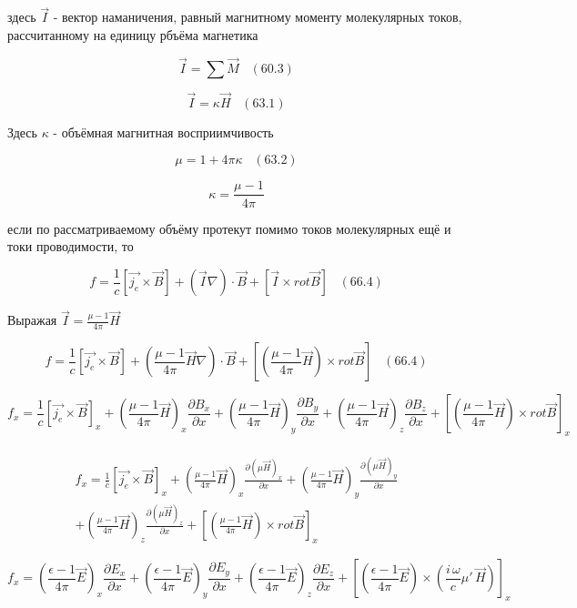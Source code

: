 \documentclass[11pt]{article}
\begin{document}
здесь \(\vec I\) - вектор наманичения, равный магнитному моменту
молекулярных токов, рассчитанному на единицу рбъёма магнетика

\[\vec I = \sum \vec M \,\,\,\,\,(60.3)\]

\[\vec I = \kappa \vec H \,\,\,\,\,(63.1)\]

Здесь \(\kappa\) - объёмная магнитная восприимчивость

\[\mu = 1+4\pi\kappa \,\,\,\,\,(63.2)\]

\[\kappa  = \frac{\mu - 1}{4\pi}\]

если по рассматриваемому объёму протекут помимо токов молекулярных ещё и
токи проводимости, то

\[f = \frac{1}{c} \left[\vec {j_e} \times \vec{B} \right] + \left(\vec {I} \nabla \right) \cdot \vec {B} + \left[\vec{I} \times rot \vec{B}\right] \,\,\,\,\,(66.4)\]

Выражая \(\vec I = \frac{\mu - 1}{4\pi} \vec H\)

\[f = \frac{1}{c} \left[\vec {j_e} \times \vec{B} \right] + \left(\frac{\mu - 1}{4\pi} \vec H \nabla \right) \cdot \vec {B} + \left[\left(\frac{\mu - 1}{4\pi} \vec H \right) \times rot \vec{B}\right] \,\,\,\,\,(66.4)\]

    \[
f_x
= \frac{1}{c} \left[\vec {j_e} \times \vec{B} \right]_x
+ \left(\frac{\mu - 1}{4 \pi}\vec{H}\right)_x \frac{\partial B_x}{\partial x}
+ \left(\frac{\mu - 1}{4 \pi}\vec{H}\right)_y \frac{\partial B_y}{\partial x}
+ \left(\frac{\mu - 1}{4 \pi}\vec{H}\right)_z \frac{\partial B_z}{\partial x}
+ \left[\left(\frac{\mu - 1}{4 \pi}\vec{H}\right) \times rot \vec{B}\right]_x
\]

    \[\begin{array}{c} \\
f_x
= \frac{1}{c} \left[\vec {j_e} \times \vec{B} \right]_x
+ \left(\frac{\mu - 1}{4 \pi}\vec{H}\right)_x \frac{\partial \left(\mu \vec{H}\right)_x}{\partial x}
+ \left(\frac{\mu - 1}{4 \pi}\vec{H}\right)_y \frac{\partial \left(\mu \vec{H}\right)_y}{\partial x} \\
+ \left(\frac{\mu - 1}{4 \pi}\vec{H}\right)_z \frac{\partial \left(\mu \vec{H}\right)_z}{\partial x}
+ \left[\left(\frac{\mu - 1}{4 \pi}\vec{H}\right) \times rot \vec{B}\right]_x
\end{array}\]

    \[
f_x
= \left(\frac{\epsilon - 1}{4 \pi}\vec{E}\right)_x \frac{\partial E_x}{\partial x}
+ \left(\frac{\epsilon - 1}{4 \pi}\vec{E}\right)_y \frac{\partial E_y}{\partial x}
+ \left(\frac{\epsilon - 1}{4 \pi}\vec{E}\right)_z \frac{\partial E_z}{\partial x}
+ \left[\left(\frac{\epsilon - 1}{4 \pi}\vec{E}\right) \times \left(\frac{i\,\omega}{c}\mu'\,\vec{H}\right)\right]_x
\]
\end{document}

